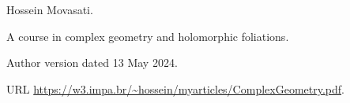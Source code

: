 Hossein Movasati.

\newblock A course in complex geometry and holomorphic foliations.

\newblock Author version dated 13 May 2024.

\newblock URL \url{https://w3.impa.br/~hossein/myarticles/ComplexGeometry.pdf}.

